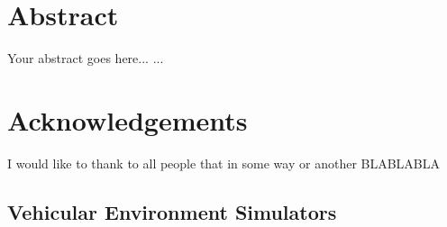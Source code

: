 \documentclass{book}
\begin{document}



%

\chapter*{Abstract}
%
Your abstract goes here...
...


\chapter*{Acknowledgements}%
%

I would like to thank to all people that in some way or another BLABLABLA


\tableofcontents
\setcounter{tocdepth}{3}

\listoffigures

\listoftables











\begin{appendices}
	\chapter {Vehicular Environment Simulators}
	
\end{appendices}



%
\end{document}
